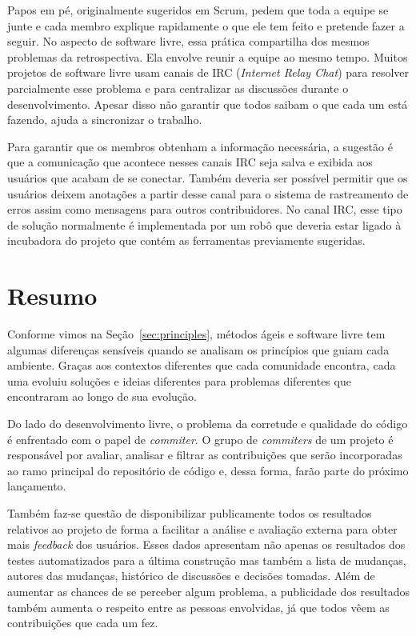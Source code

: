 Papos em pé, originalmente sugeridos em Scrum\cite{Schwaber2004},
pedem que toda a equipe se junte e cada membro explique rapidamente o
que ele tem feito e pretende fazer a seguir. No aspecto de software
livre, essa prática compartilha dos mesmos problemas da
retrospectiva. Ela envolve reunir a equipe ao mesmo tempo. Muitos
projetos de software livre usam canais de IRC (\emph{Internet Relay
  Chat}) para resolver parcialmente esse problema e para centralizar
as discussões durante o desenvolvimento. Apesar disso não garantir que
todos saibam o que cada um está fazendo, ajuda a sincronizar o
trabalho.

Para garantir que os membros obtenham a informação necessária, a
sugestão é que a comunicação que acontece nesses canais IRC seja salva
e exibida aos usuários que acabam de se conectar. Também deveria ser
possível permitir que os usuários deixem anotações a partir desse
canal para o sistema de rastreamento de erros assim como mensagens
para outros contribuidores. No canal IRC, esse tipo de solução
normalmente é implementada por um robô que deveria estar ligado à
incubadora do projeto que contém as ferramentas previamente sugeridas.

\section{Resumo}
\label{sec:resumo-diffs}

Conforme vimos na Seção~\ref{sec:principles}, métodos ágeis e software
livre tem algumas diferenças sensíveis quando se analisam os
princípios que guiam cada ambiente. Graças aos contextos diferentes
que cada comunidade encontra, cada uma evoluiu soluções e ideias
diferentes para problemas diferentes que encontraram ao longo de sua
evolução.

Do lado do desenvolvimento livre, o problema da corretude e qualidade
do código é enfrentado com o papel de \emph{commiter}. O grupo de
\emph{commiters} de um projeto é responsável por avaliar, analisar e
filtrar as contribuições que serão incorporadas ao ramo principal do
repositório de código e, dessa forma, farão parte do próximo
lançamento.

Também faz-se questão de disponibilizar publicamente todos os
resultados relativos ao projeto de forma a facilitar a análise e
avaliação externa para obter mais \textit{feedback} dos
usuários. Esses dados apresentam não apenas os resultados dos testes
automatizados para a última construção mas também a lista de mudanças,
autores das mudanças, histórico de discussões e decisões tomadas. Além
de aumentar as chances de se perceber algum problema, a publicidade
dos resultados também aumenta o respeito entre as pessoas envolvidas,
já que todos vêem as contribuições que cada um fez.

